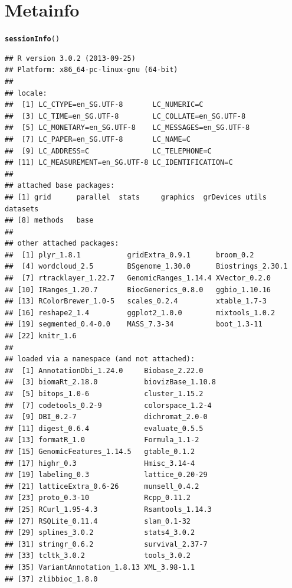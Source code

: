 \documentclass{article}\usepackage[]{graphicx}\usepackage[]{color}
\makeatletter
\newcommand{\hlstd}[1]{\textcolor[rgb]{0.345,0.345,0.345}{#1}}%
\newcommand{\hlkwd}[1]{\textcolor[rgb]{0.737,0.353,0.396}{\textbf{#1}}}%
\newenvironment{kframe}{%
 \def\at@end@of@kframe{}%
 \ifinner\ifhmode%
  \def\at@end@of@kframe{\end{minipage}}%
  \begin{minipage}{\columnwidth}%
 \fi\fi%
 \def\FrameCommand##1{\hskip\@totalleftmargin \hskip-\fboxsep
 \colorbox{shadecolor}{##1}\hskip-\fboxsep
     \hskip-\linewidth \hskip-\@totalleftmargin \hskip\columnwidth}%
 \MakeFramed {\advance\hsize-\width
   \@totalleftmargin\z@ \linewidth\hsize
   \@setminipage}}%
 {\par\unskip\endMakeFramed%
 \at@end@of@kframe}
\newenvironment{knitrout}{}{} %
\makeatother
\begin{document}
\section{Metainfo}
\begin{knitrout}
\color{fgcolor}\begin{kframe}
\begin{alltt}
\hlkwd{sessionInfo}\hlstd{()}
\end{alltt}
\begin{verbatim}
## R version 3.0.2 (2013-09-25)
## Platform: x86_64-pc-linux-gnu (64-bit)
## 
## locale:
##  [1] LC_CTYPE=en_SG.UTF-8       LC_NUMERIC=C              
##  [3] LC_TIME=en_SG.UTF-8        LC_COLLATE=en_SG.UTF-8    
##  [5] LC_MONETARY=en_SG.UTF-8    LC_MESSAGES=en_SG.UTF-8   
##  [7] LC_PAPER=en_SG.UTF-8       LC_NAME=C                 
##  [9] LC_ADDRESS=C               LC_TELEPHONE=C            
## [11] LC_MEASUREMENT=en_SG.UTF-8 LC_IDENTIFICATION=C       
## 
## attached base packages:
## [1] grid      parallel  stats     graphics  grDevices utils     datasets 
## [8] methods   base     
## 
## other attached packages:
##  [1] plyr_1.8.1           gridExtra_0.9.1      broom_0.2           
##  [4] wordcloud_2.5        BSgenome_1.30.0      Biostrings_2.30.1   
##  [7] rtracklayer_1.22.7   GenomicRanges_1.14.4 XVector_0.2.0       
## [10] IRanges_1.20.7       BiocGenerics_0.8.0   ggbio_1.10.16       
## [13] RColorBrewer_1.0-5   scales_0.2.4         xtable_1.7-3        
## [16] reshape2_1.4         ggplot2_1.0.0        mixtools_1.0.2      
## [19] segmented_0.4-0.0    MASS_7.3-34          boot_1.3-11         
## [22] knitr_1.6           
## 
## loaded via a namespace (and not attached):
##  [1] AnnotationDbi_1.24.0     Biobase_2.22.0          
##  [3] biomaRt_2.18.0           biovizBase_1.10.8       
##  [5] bitops_1.0-6             cluster_1.15.2          
##  [7] codetools_0.2-9          colorspace_1.2-4        
##  [9] DBI_0.2-7                dichromat_2.0-0         
## [11] digest_0.6.4             evaluate_0.5.5          
## [13] formatR_1.0              Formula_1.1-2           
## [15] GenomicFeatures_1.14.5   gtable_0.1.2            
## [17] highr_0.3                Hmisc_3.14-4            
## [19] labeling_0.3             lattice_0.20-29         
## [21] latticeExtra_0.6-26      munsell_0.4.2           
## [23] proto_0.3-10             Rcpp_0.11.2             
## [25] RCurl_1.95-4.3           Rsamtools_1.14.3        
## [27] RSQLite_0.11.4           slam_0.1-32             
## [29] splines_3.0.2            stats4_3.0.2            
## [31] stringr_0.6.2            survival_2.37-7         
## [33] tcltk_3.0.2              tools_3.0.2             
## [35] VariantAnnotation_1.8.13 XML_3.98-1.1            
## [37] zlibbioc_1.8.0
\end{verbatim}
\end{kframe}
\end{knitrout}
\end{document}
